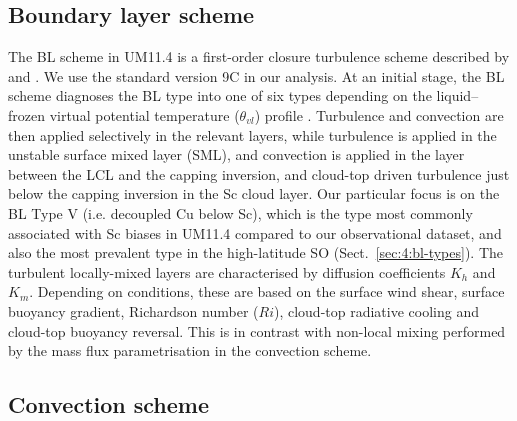 \subsection{Boundary layer scheme}
\label{sec:4:bl-scheme}

The BL scheme in UM11.4 is a first-order closure turbulence
scheme described by \cite{lock2000} and \cite{martin2000}. We use the standard
version 9C in our analysis.
At an initial stage, the BL scheme diagnoses the BL type
into one of six types depending on the liquid--frozen virtual potential
temperature ($\theta_{vl}$) profile \cite[Fig. 1]{lock2000}. Turbulence and convection
are then applied selectively in the relevant layers, while turbulence is applied in the unstable surface mixed layer (SML), and convection is applied in the layer between
the LCL and the capping inversion, and cloud-top driven turbulence just below
the capping inversion in the Sc cloud layer. Our particular focus is on
the BL Type V (i.e. decoupled Cu below Sc), which is the type most commonly
associated with Sc biases in UM11.4 compared to our observational dataset,
and also the most prevalent type in the high-latitude SO (Sect.~\ref{sec:4:bl-types}).
The turbulent locally-mixed layers are characterised by diffusion coefficients
$K_h$ and $K_m$. Depending on conditions, these are based on the surface wind
shear, surface buoyancy gradient, Richardson number ($Ri$),
cloud-top radiative cooling and cloud-top buoyancy reversal. This is in contrast
with non-local mixing performed by the mass flux parametrisation in the
convection scheme.

\subsection{Convection scheme}
\label{sec:4:convection-scheme}

